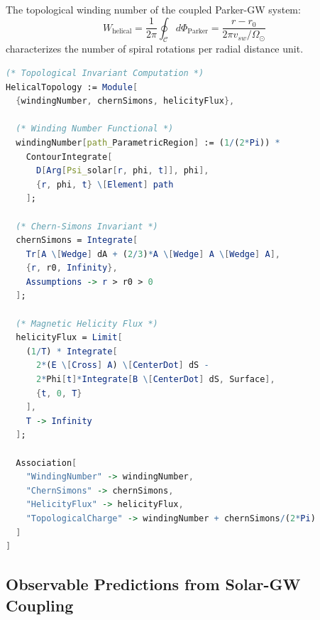 \begin{definition}
The topological winding number of the coupled Parker-GW system:
\begin{equation}
W_{\text{helical}} = \frac{1}{2\pi} \oint_{\mathcal{C}} d\Phi_{\text{Parker}} = \frac{r - r_0}{2\pi v_{sw}/\Omega_{\odot}}
\end{equation}
characterizes the number of spiral rotations per radial distance unit.
\end{definition}


\begin{lstlisting}[language=Mathematica]
(* Topological Invariant Computation *)
HelicalTopology := Module[
  {windingNumber, chernSimons, helicityFlux},
  
  (* Winding Number Functional *)
  windingNumber[path_ParametricRegion] := (1/(2*Pi)) * 
    ContourIntegrate[
      D[Arg[Psi_solar[r, phi, t]], phi],
      {r, phi, t} \[Element] path
    ];
  
  (* Chern-Simons Invariant *)
  chernSimons = Integrate[
    Tr[A \[Wedge] dA + (2/3)*A \[Wedge] A \[Wedge] A],
    {r, r0, Infinity},
    Assumptions -> r > r0 > 0
  ];
  
  (* Magnetic Helicity Flux *)
  helicityFlux = Limit[
    (1/T) * Integrate[
      2*(E \[Cross] A) \[CenterDot] dS - 
      2*Phi[t]*Integrate[B \[CenterDot] dS, Surface],
      {t, 0, T}
    ],
    T -> Infinity
  ];
  
  Association[
    "WindingNumber" -> windingNumber,
    "ChernSimons" -> chernSimons,
    "HelicityFlux" -> helicityFlux,
    "TopologicalCharge" -> windingNumber + chernSimons/(2*Pi)
  ]
]
\end{lstlisting}


\subsection{Observable Predictions from Solar-GW Coupling}


